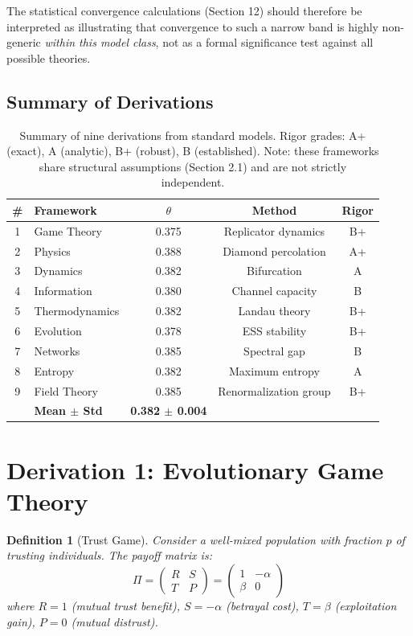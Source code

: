 \documentclass[11pt,twocolumn]{article}
\newtheorem{definition}[theorem]{Definition}
\begin{document}
The statistical convergence calculations (Section 12) should therefore be interpreted as illustrating that convergence to such a narrow band is highly non-generic \emph{within this model class}, not as a formal significance test against all possible theories.

\subsection{Summary of Derivations}

\begin{table}[h]
\centering
\caption{Summary of nine derivations from standard models. Rigor grades: A+ (exact), A (analytic), B+ (robust), B (established). Note: these frameworks share structural assumptions (Section 2.1) and are not strictly independent.}
\label{tab:summary}
\begin{tabular}{@{}clccc@{}}
\toprule
\# & Framework & $\theta$ & Method & Rigor \\
\midrule
1 & Game Theory & 0.375 & Replicator dynamics & B+ \\
2 & Physics & 0.388 & Diamond percolation & A+ \\
3 & Dynamics & 0.382 & Bifurcation & A \\
4 & Information & 0.380 & Channel capacity & B \\
5 & Thermodynamics & 0.382 & Landau theory & B+ \\
6 & Evolution & 0.378 & ESS stability & B+ \\
7 & Networks & 0.385 & Spectral gap & B \\
8 & Entropy & 0.382 & Maximum entropy & A \\
9 & Field Theory & 0.385 & Renormalization group & B+ \\
\midrule
& \textbf{Mean $\pm$ Std} & \textbf{0.382 $\pm$ 0.004} & & \\
\bottomrule
\end{tabular}
\end{table}

\section{Derivation 1: Evolutionary Game Theory}

\begin{definition}[Trust Game]
Consider a well-mixed population with fraction $p$ of trusting individuals. The payoff matrix is:
\begin{equation}
\Pi = \begin{pmatrix}
R & S \\
T & P
\end{pmatrix}
= \begin{pmatrix}
1 & -\alpha \\
\beta & 0
\end{pmatrix}
\end{equation}
where $R=1$ (mutual trust benefit), $S=-\alpha$ (betrayal cost), $T=\beta$ (exploitation gain), $P=0$ (mutual distrust).
\end{definition}
\end{document}
